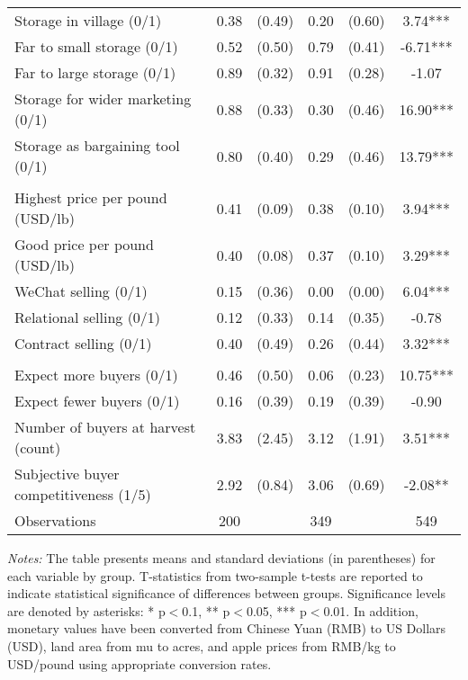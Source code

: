 \begin{table}[H]
{\begin{tabular}{lccccc}
Storage in village (0/1) & 0.38 & (0.49) & 0.20 & (0.60) & 3.74*** \\
Far to small storage (0/1) & 0.52 & (0.50) & 0.79 & (0.41) & -6.71*** \\
Far to large storage (0/1) & 0.89 & (0.32) & 0.91 & (0.28) & -1.07 \\
Storage for wider marketing (0/1) & 0.88 & (0.33) & 0.30 & (0.46) & 16.90*** \\
Storage as bargaining tool (0/1) & 0.80 & (0.40) & 0.29 & (0.46) & 13.79*** \\
\addlinespace
\multicolumn{6}{l}{\textbf{Panel D: Marketing}} \\
Highest price per pound (USD/lb) & 0.41 & (0.09) & 0.38 & (0.10) & 3.94*** \\
Good price per pound (USD/lb) & 0.40 & (0.08) & 0.37 & (0.10) & 3.29*** \\
WeChat selling (0/1) & 0.15 & (0.36) & 0.00 & (0.00) & 6.04*** \\
Relational selling (0/1) & 0.12 & (0.33) & 0.14 & (0.35) & -0.78 \\
Contract selling (0/1) & 0.40 & (0.49) & 0.26 & (0.44) & 3.32*** \\
\addlinespace
\multicolumn{6}{l}{\textbf{Panel E: Market Competitive Conditions}} \\
Expect more buyers (0/1) & 0.46 & (0.50) & 0.06 & (0.23) & 10.75*** \\
Expect fewer buyers (0/1) & 0.16 & (0.39) & 0.19 & (0.39) & -0.90 \\
Number of buyers at harvest (count) & 3.83 & (2.45) & 3.12 & (1.91) & 3.51*** \\
Subjective buyer competitiveness (1/5) & 2.92 & (0.84) & 3.06 & (0.69) & -2.08** \\
\hline
\hline
Observations & 200 & & 349 & & 549 \\
\bottomrule
\end{tabular}%
} %
\begin{tablenotes} 
\item \textit{Notes:} The table presents means and standard deviations (in parentheses) for each variable by group. T-statistics from two-sample t-tests are reported to indicate statistical significance of differences between groups. Significance levels are denoted by asterisks: * p$<$0.1, ** p$<$0.05, *** p$<$0.01. In addition, monetary values have been converted from Chinese Yuan (RMB) to US Dollars (USD), land area from mu to acres, and apple prices from RMB/kg to USD/pound using appropriate conversion rates. 
\end{tablenotes} 
\end{table}

